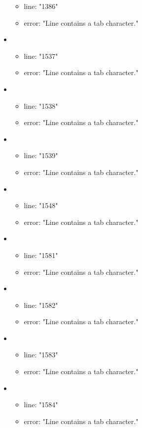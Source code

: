 \begin{itemize}
\begin{itemize}
		\item line: "1386" 
		\item error: "Line contains a tab character." 
	\end{itemize}
	\item 
	\begin{itemize} 
		\item line: "1537" 
		\item error: "Line contains a tab character." 
	\end{itemize}
	\item 
	\begin{itemize} 
		\item line: "1538" 
		\item error: "Line contains a tab character." 
	\end{itemize}
	\item 
	\begin{itemize} 
		\item line: "1539" 
		\item error: "Line contains a tab character." 
	\end{itemize}
	\item 
	\begin{itemize} 
		\item line: "1548" 
		\item error: "Line contains a tab character." 
	\end{itemize}
	\item 
	\begin{itemize} 
		\item line: "1581" 
		\item error: "Line contains a tab character." 
	\end{itemize}
	\item 
	\begin{itemize} 
		\item line: "1582" 
		\item error: "Line contains a tab character." 
	\end{itemize}
	\item 
	\begin{itemize} 
		\item line: "1583" 
		\item error: "Line contains a tab character." 
	\end{itemize}
	\item 
	\begin{itemize} 
		\item line: "1584" 
		\item error: "Line contains a tab character." 

\end{itemize}
\end{itemize}
